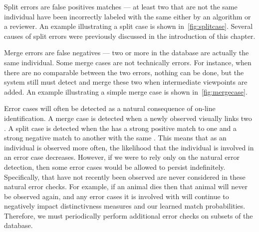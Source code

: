     Split errors are false positives matches --- \ie{} at least two
      \annots{} that are not the same individual have been incorrectly
      labeled with the same \name{} either by an algorithm or a reviewer.
    An example illustrating a split case is shown in~\cref{fig:splitcase}.
    Several causes of split errors were previously discussed in the
      introduction of this chapter.

    Merge errors are false negatives --- \ie{} two or more \names{} in the
      database are actually the same individual.
    Some merge cases are not technically errors.
    For instance, when there are no comparable \annots{} between the two
      \names{} errors, nothing can be done, but the system still must detect and
      merge these two \annots{} when intermediate viewpoints are added.
    An example illustrating a simple merge case is shown
      in~\cref{fig:mergecase}.

    \splitcase{}

    \mergecase{}

    Error cases will often be detected as a natural consequence of on-line
      identification.
    A merge case is detected when a newly observed \encounter{} visually links
      two \names{}.
    A split case is detected when the \encounter{} has a strong positive match
      to one \exemplar{} and a strong negative match to another \exemplar{} with
      the same \name{}.
    This means that as an individual is observed more often, the likelihood
      that the individual is involved in an error case decreases.
    However, if we were to rely only on the natural error detection, then some
      error cases would be allowed to persist indefinitely.
    Specifically, \names{} that have not recently been observed are never
      considered in these natural error checks.
    For example, if an animal dies then that animal will never be observed
      again, and any error cases it is involved with will continue to negatively
      impact distinctivness measures and our learned match probabilities.
    Therefore, we must periodically perform additional error checks on subsets
      of the database.

